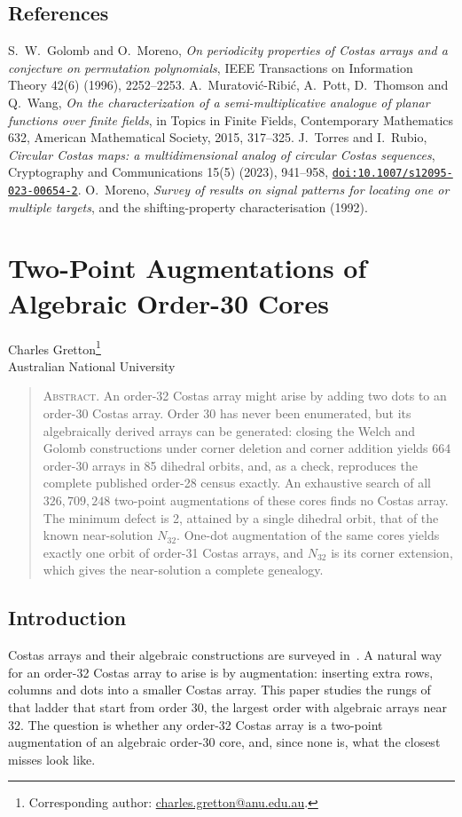 \documentclass[11pt,a4paper,oneside]{report}
\makeatletter
\theoremstyle{definition}
\newcommand{\paperauthor}{\begin{center}\large Charles Gretton\footnote{Corresponding author: \href{mailto:charles.gretton@anu.edu.au}{charles.gretton@anu.edu.au}.}\\[2pt]\normalsize Australian National University\end{center}\vspace{0.5em}}
\newcommand{\paperabstract}[1]{\begin{quote}\small\noindent\textsc{Abstract.} #1\end{quote}\vspace{0.5em}}
\newenvironment{paperrefs}{\section*{References}\list{\@biblabel{\@arabic\c@enumiv}}{\settowidth\labelwidth{\@biblabel{99}}\leftmargin\labelwidth\advance\leftmargin\labelsep\usecounter{enumiv}\let\p@enumiv\@empty\renewcommand\theenumiv{\@arabic\c@enumiv}}\sloppy\small}{\endlist}
\makeatother
\begin{document}
\begin{paperrefs}
 S.~W.~Golomb and O.~Moreno, \emph{On periodicity properties of Costas arrays and a conjecture on permutation polynomials}, IEEE Transactions on Information Theory 42(6) (1996), 2252--2253.
 A.~Muratovi\'c-Ribi\'c, A.~Pott, D.~Thomson and Q.~Wang, \emph{On the characterization of a semi-multiplicative analogue of planar functions over finite fields}, in Topics in Finite Fields, Contemporary Mathematics 632, American Mathematical Society, 2015, 317--325.
 J.~Torres and I.~Rubio, \emph{Circular Costas maps: a multidimensional analog of circular Costas sequences}, Cryptography and Communications 15(5) (2023), 941--958, \href{https://doi.org/10.1007/s12095-023-00654-2}{\texttt{doi:10.1007/s12095-023-00654-2}}.
 O.~Moreno, \emph{Survey of results on signal patterns for
locating one or multiple targets}, and the shifting-property characterisation
(1992).
\end{paperrefs}

\clearpage
\chapter{Two-Point Augmentations of Algebraic Order-30 Cores}\label{p2-paper}
\paperauthor
\paperabstract{An order-32 Costas array might arise by adding two dots to an order-30 Costas array. Order 30
has never been enumerated, but its algebraically derived arrays can be generated: closing the Welch
and Golomb constructions under corner deletion and corner addition yields 664 order-30 arrays in 85
dihedral orbits, and, as a check, reproduces the complete published order-28 census exactly. An
exhaustive search of all $326{,}709{,}248$ two-point augmentations of these cores finds no Costas
array. The minimum defect is 2, attained by a single dihedral orbit, that of the known near-solution
$N_{32}$. One-dot augmentation of the same cores yields exactly one orbit of order-31 Costas arrays,
and $N_{32}$ is its corner extension, which gives the near-solution a complete genealogy.}

\section{Introduction}\label{p2-sec:paperintro}
Costas arrays and their algebraic constructions are surveyed in~\cite{p2-golombtaylor}. A natural way for an order-32 Costas array to arise is by augmentation: inserting extra rows,
columns and dots into a smaller Costas array. This paper studies the rungs of that ladder that start
from order 30, the largest order with algebraic arrays near 32. The question is whether any order-32
Costas array is a two-point augmentation of an algebraic order-30 core, and, since none is, what the
closest misses look like.
\end{document}
